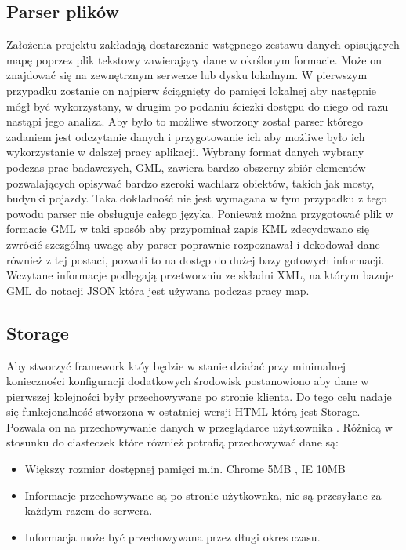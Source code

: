 \subsection{Parser plików}
\label{subsec:parser}

Założenia projektu zakładają dostarczanie wstępnego zestawu danych opisujących mapę poprzez plik tekstowy zawierający dane w okrślonym formacie. Może on znajdować się na zewnętrznym serwerze lub dysku lokalnym. W pierwszym przypadku zostanie on najpierw ściągnięty do pamięci lokalnej aby następnie mógł być wykorzystany, w drugim po podaniu ścieżki dostępu do niego  od razu nastąpi jego analiza. Aby było to możliwe stworzony został parser którego zadaniem jest odczytanie danych i przygotowanie ich aby możliwe było ich wykorzystanie w dalszej pracy aplikacji.
Wybrany format danych wybrany podczas prac badawczych, GML, zawiera bardzo obszerny zbiór elementów pozwalających opisywać bardzo szeroki wachlarz obiektów, takich jak mosty, budynki pojazdy. Taka dokładność nie jest wymagana w tym przypadku z tego powodu parser nie obsługuje całego języka. Ponieważ można przygotować plik w formacie GML w taki sposób aby przypominał zapis KML zdecydowano się zwrócić szczgólną uwagę aby parser poprawnie rozpoznawał i dekodował dane również z tej postaci, pozwoli to na dostęp do dużej bazy gotowych informacji.
Wczytane informacje podlegają przetworzniu ze składni XML, na którym bazuje GML do notacji JSON która jest używana podczas pracy map.

\subsection{Storage}
\label{subsec:storage5}
Aby stworzyć framework któy będzie w stanie działać przy minimalnej konieczności konfiguracji dodatkowych środowisk postanowiono aby dane w pierwszej kolejności były przechowywane po stronie klienta. Do tego celu nadaje się funkcjonalność stworzona w ostatniej wersji HTML którą jest Storage. Pozwala on na przechowywanie danych w przeglądarce użytkownika \cite{html5dive}. Różnicą w stosunku do ciasteczek które również potrafią przechowywać dane są:
\begin{itemize}
\item
Większy rozmiar dostępnej pamięci m.in. Chrome 5MB \nocite{chrome5mb}, IE 10MB
\item
Informacje przechowywane są po stronie użytkownka, nie są przesyłane za każdym razem do serwera.
\item
Informacja może być przechowywana przez długi okres czasu.
\end{itemize}

